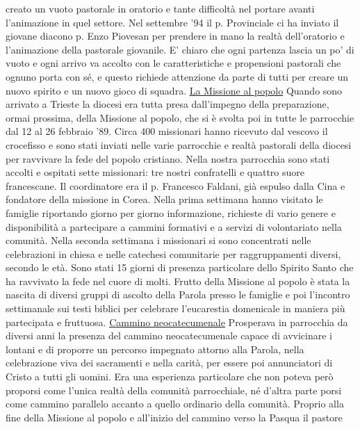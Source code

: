creato un vuoto pastorale in oratorio e tante difficoltà nel portare avanti l'animazione in quel settore. 
Nel settembre '94 il p. Provinciale ci ha inviato il giovane diacono p. Enzo Piovesan per prendere in 
mano la realtà dell'oratorio e l'animazione della pastorale giovanile. 
E' chiaro che ogni partenza lascia un po' di vuoto e ogni arrivo va accolto con le caratteristiche e 
propensioni pastorali che ognuno porta con sé, e questo richiede attenzione da parte di tutti per 
creare un nuovo spirito e un nuovo gioco di squadra.
\bigbreak
{}
\noindent\underline{La Missione al popolo}
\medbreak
\noindent Quando sono arrivato a Trieste la diocesi era tutta presa dall'impegno della preparazione, 
ormai prossima, della Missione al popolo, che si è svolta poi in tutte le parrocchie dal 12 al 26 
febbraio '89.
Circa 400 missionari hanno ricevuto dal vescovo il crocefisso e sono stati inviati nelle varie 
parrocchie e realtà pastorali della diocesi per ravvivare la fede del popolo cristiano. Nella nostra 
parrocchia sono stati accolti e ospitati sette missionari: tre nostri confratelli e quattro suore 
francescane. Il coordinatore era il p. Francesco Faldani, già espulso dalla Cina e fondatore della 
missione in Corea. Nella prima settimana hanno visitato le famiglie riportando giorno per giorno 
informazione, richieste di vario genere e disponibilità a partecipare a cammini formativi e a servizi 
di volontariato nella comunità. Nella seconda settimana i missionari si sono concentrati nelle 
celebrazioni in chiesa e nelle catechesi comunitarie per raggruppamenti diversi, secondo le età.
Sono stati 15 giorni di presenza particolare dello Spirito Santo che ha ravvivato la fede nel 
cuore di molti. Frutto della Missione al popolo è stata la nascita di diversi gruppi di ascolto della 
Parola presso le famiglie e poi l'incontro settimanale sui testi biblici per celebrare l'eucarestia 
domenicale in maniera più partecipata e fruttuosa.
\bigbreak
{}
\noindent \underline{Cammino neocatecumenale}
\medbreak
\noindent Prosperava in parrocchia da diversi anni la presenza del cammino neocatecumenale capace 
di avvicinare i lontani e di proporre un percorso impegnato attorno alla Parola, nella celebrazione 
viva dei sacramenti e nella carità, per essere poi annunciatori di Cristo a tutti gli uomini. Era una 
esperienza particolare che non poteva però proporsi come l'unica realtà della comunità parrocchiale, 
né d'altra parte porsi come cammino parallelo accanto a quello ordinario della comunità. 
Proprio alla fine della Missione al popolo e all'inizio del cammino verso la Pasqua il pastore 
